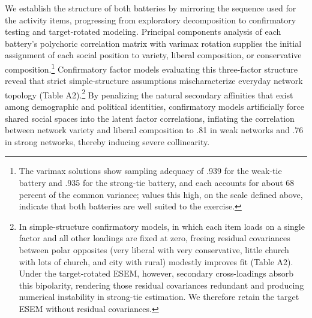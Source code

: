 \documentclass[
  12pt
]{article}
\begin{document}
We establish the structure of both batteries by mirroring the sequence used for the activity items, progressing from exploratory decomposition to confirmatory testing and target-rotated modeling. Principal components analysis of each battery's polychoric correlation matrix with varimax rotation supplies the initial assignment of each social position to variety, liberal composition, or conservative composition.\footnote{The varimax solutions show sampling adequacy of .939 for the weak-tie battery and .935 for the strong-tie battery, and each accounts for about 68 percent of the common variance; values this high, on the scale defined above, indicate that both batteries are well suited to the exercise.} Confirmatory factor models evaluating this three-factor structure reveal that strict simple-structure assumptions mischaracterize everyday network topology (Table A2).\footnote{In simple-structure confirmatory models, in which each item loads on a single factor and all other loadings are fixed at zero, freeing residual covariances between polar opposites (very liberal with very conservative, little church with lots of church, and city with rural) modestly improves fit (Table A2). Under the target-rotated ESEM, however, secondary cross-loadings absorb this bipolarity, rendering those residual covariances redundant and producing numerical instability in strong-tie estimation. We therefore retain the target ESEM without residual covariances.} By penalizing the natural secondary affinities that exist among demographic and political identities, confirmatory models artificially force shared social spaces into the latent factor correlations, inflating the correlation between network variety and liberal composition to .81 in weak networks and .76 in strong networks, thereby inducing severe collinearity. 
\end{document}
